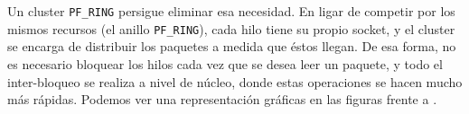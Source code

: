 Un cluster \texttt{PF\_RING} persigue eliminar esa necesidad. En ligar de competir por los mismos recursos (el anillo 
\texttt{PF\_RING}), cada hilo tiene su propio socket, y el cluster se encarga de distribuir los paquetes a medida que 
éstos llegan. De esa forma, no es necesario bloquear los hilos cada vez que se desea leer un paquete, y todo el 
inter-bloqueo se realiza a nivel de núcleo, donde estas operaciones se hacen mucho más rápidas. Podemos ver una 
representación gráficas en las figuras  frente a  
\cite{MonitoringUsingNtop}.

% 

\endinput

\begin{Resumen}[Resumen de PF RING]


\subsection*{S1}

\end{Resumen}

